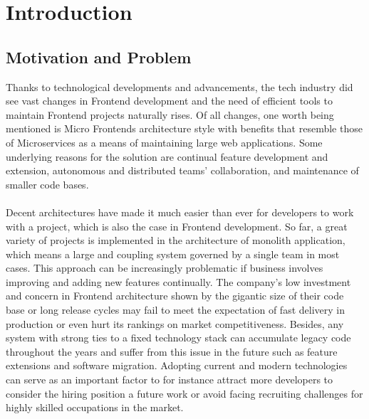 \documentclass[a4paper]{book}
\begin{document}

\tableofcontents           %
\listoffigures             %
\listoftables              %

\clearpage


\chapter{Introduction}

 \section{Motivation and Problem}
Thanks to technological developments and advancements, the tech industry did see vast changes in Frontend development and the need of efficient tools to maintain Frontend projects naturally rises. Of all changes, one worth being mentioned is Micro Frontends architecture style with benefits that resemble those of Microservices as a means of maintaining large web applications. Some underlying reasons for the solution are continual feature development and extension, autonomous and distributed teams’ collaboration, and maintenance of smaller code bases. 
\\
\\
Decent architectures have made it much easier than ever for developers to work with a project, which is also the case in Frontend development. So far, a great variety of projects is implemented in the architecture of monolith application, which means a large and coupling system governed by a single team in most cases. This approach can be increasingly problematic if business involves improving and adding new features continually. The company’s low investment and concern in Frontend architecture shown by the gigantic size of their code base or long release cycles may fail to meet the expectation of fast delivery in production or even hurt its rankings on market competitiveness. Besides, any system with strong ties to a fixed technology stack can accumulate legacy code throughout the years and suffer from this issue in the future such as feature extensions and software migration. Adopting current and modern technologies can serve as an important factor to for instance attract more developers to consider the hiring position a future work or avoid facing recruiting challenges for highly skilled occupations in the market.
\end{document}
